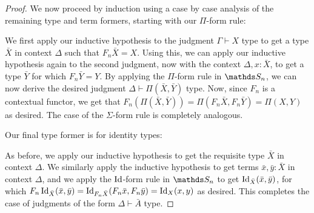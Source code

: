 \documentclass{article}
\begin{document}
\begin{proof}
    We now proceed by induction using a case by case analysis of the remaining type and term formers, starting with our $\Pi$-form rule:
    \begin{prooftree}
    \end{prooftree}
    We first apply our inductive hypothesis to the judgment $\Gamma\vdash X$ type to get a type $\bar{X}$ in context $\Delta$ such that $F_n\bar{X}=X$. Using this, we can apply our inductive hypothesis again to the second judgment, now with the context $\Delta,x:\bar{X}$, to get a type $\bar{Y}$ for which $F_n\bar{Y}=Y$. By applying the $\Pi$-form rule in $\bS_n$, we can now derive the desired judgment $\Delta\vdash\Pi(\bar{X},\bar{Y})$ type. Now, since $F_n$ is a contextual functor, we get that $F_n(\Pi(\bar{X},\bar{Y}))=\Pi(F_n\bar{X},F_n\bar{Y})=\Pi(X,Y)$ as desired. The case of the $\Sigma$-form rule is completely analogous.

    Our final type former is for identity types:
    \begin{prooftree}
    \end{prooftree}
    As before, we apply our inductive hypothesis to get the requisite type $\bar{X}$ in context $\Delta$. We similarly apply the inductive hypothesis to get terms $\bar{x},\bar{y}:\bar{X}$ in context $\Delta$, and we apply the $\operatorname{Id}$-form rule in $\bS_n$ to get $\operatorname{Id}_{\bar{X}}(\bar{x},\bar{y})$, for which $F_n\operatorname{Id}_{\bar{X}}(\bar{x},\bar{y})=\operatorname{Id}_{F_n\bar{X}}(F_n\bar{x},F_n\bar{y})=\operatorname{Id}_X(x,y)$ as desired. This completes the case of judgments of the form $\Delta\vdash\bar{A}$ type.


\end{proof}
\end{document}
